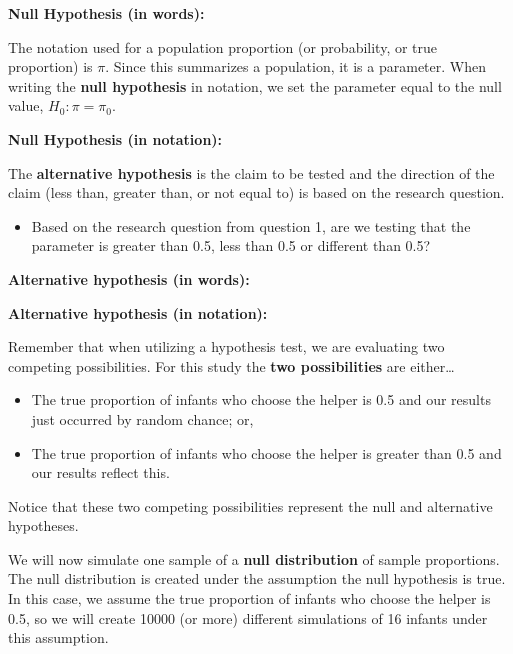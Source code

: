 \documentclass[
]{report}
\providecommand{\tightlist}{%
  \setlength{\itemsep}{0pt}\setlength{\parskip}{0pt}}
\begin{document}
\textbf{Null Hypothesis (in words):}

\vspace{0.5in}

The notation used for a population proportion (or probability, or true proportion) is \(\pi\). Since this summarizes a population, it is a parameter. When writing the \textbf{null hypothesis} in notation, we set the parameter equal to the null value, \(H_0: \pi = \pi_0\).

\textbf{Null Hypothesis (in notation):}

\vspace{0.5in}

The \textbf{alternative hypothesis} is the claim to be tested and the direction of the claim (less than, greater than, or not equal to) is based on the research question.

\begin{itemize}
\tightlist
\item
  Based on the research question from question 1, are we testing that the parameter is greater than 0.5, less than 0.5 or different than 0.5?
\end{itemize}

\vspace{0.2in}

\textbf{Alternative hypothesis (in words):}

\vspace{0.5in}

\textbf{Alternative hypothesis (in notation):}

\vspace{0.5in}

Remember that when utilizing a hypothesis test, we are evaluating two competing possibilities. For this study the \textbf{two possibilities} are either\ldots{}

\begin{itemize}
\item
  The true proportion of infants who choose the helper is 0.5 and our results just occurred by random chance; or,
\item
  The true proportion of infants who choose the helper is greater than 0.5 and our results reflect this.
\end{itemize}

Notice that these two competing possibilities represent the null and alternative hypotheses.

We will now simulate one sample of a \textbf{null distribution} of sample proportions. The null distribution is created under the assumption the null hypothesis is true. In this case, we assume the true proportion of infants who choose the helper is 0.5, so we will create 10000 (or more) different simulations of 16 infants under this assumption.
\end{document}
